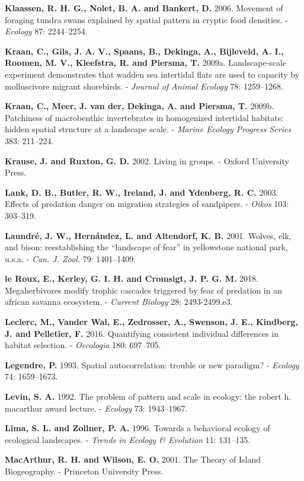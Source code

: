 \documentclass[]{scrartcl}
\begin{document}
\begin{multicols}{2}
\textbf{Klaassen, R. H. G., Nolet, B. A. and Bankert, D.} 2006. Movement
of foraging tundra swans explained by spatial pattern in cryptic food
densities. - \emph{Ecology} 87: 2244--2254.

\textbf{Kraan, C., Gils, J. A. V., Spaans, B., Dekinga, A., Bijleveld,
A. I., Roomen, M. V., Kleefstra, R. and Piersma, T.} 2009a.
Landscape-scale experiment demonstrates that wadden sea intertidal flats
are used to capacity by molluscivore migrant shorebirds. - \emph{Journal
of Animal Ecology} 78: 1259--1268.

\textbf{Kraan, C., Meer, J. van der, Dekinga, A. and Piersma, T.} 2009b.
Patchiness of macrobenthic invertebrates in homogenized intertidal
habitats: hidden spatial structure at a landscape scale. - \emph{Marine
Ecology Progress Series} 383: 211--224.

\textbf{Krause, J. and Ruxton, G. D.} 2002. Living in groups. - Oxford
University Press.

\textbf{Lank, D. B., Butler, R. W., Ireland, J. and Ydenberg, R. C.}
2003. Effects of predation danger on migration strategies of sandpipers.
- \emph{Oikos} 103: 303--319.

\textbf{Laundré, J. W., Hernández, L. and Altendorf, K. B.} 2001.
Wolves, elk, and bison: reestablishing the ``landscape of fear'' in
yellowstone national park, u.s.a. - \emph{Can. J. Zool.} 79: 1401--1409.

\textbf{le Roux, E., Kerley, G. I. H. and Cromsigt, J. P. G. M.} 2018.
Megaherbivores modify trophic cascades triggered by fear of predation in
an african savanna ecosystem. - \emph{Current Biology} 28: 2493-2499.e3.

\textbf{Leclerc, M., Vander Wal, E., Zedrosser, A., Swenson, J. E.,
Kindberg, J. and Pelletier, F.} 2016. Quantifying consistent individual
differences in habitat selection. - \emph{Oecologia} 180: 697--705.

\textbf{Legendre, P.} 1993. Spatial autocorrelation: trouble or new
paradigm? - \emph{Ecology} 74: 1659--1673.

\textbf{Levin, S. A.} 1992. The problem of pattern and scale in ecology:
the robert h. macarthur award lecture. - \emph{Ecology} 73: 1943--1967.

\textbf{Lima, S. L. and Zollner, P. A.} 1996. Towards a behavioral
ecology of ecological landscapes. - \emph{Trends in Ecology \&
Evolution} 11: 131--135.

\textbf{MacArthur, R. H. and Wilson, E. O.} 2001. The Theory of Island
Biogeography. - Princeton University Press.


\end{multicols}
\end{document}
